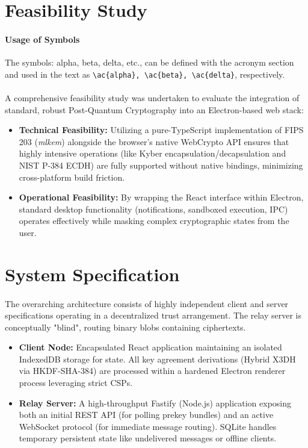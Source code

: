 \section{Feasibility Study}
\paragraph{Usage of Symbols} The symbols: \ac{alpha}, \ac{beta}, \ac{delta}, etc., can be defined with the acronym section and used in the text as \verb|\ac{alpha}, \ac{beta}, \ac{delta}|, respectively. 

\paragraph{}
A comprehensive feasibility study was undertaken to evaluate the integration of standard, robust Post-Quantum Cryptography into an Electron-based web stack:
\begin{itemize}
	\item \textbf{Technical Feasibility:} Utilizing a pure-TypeScript implementation of FIPS 203 (\textit{mlkem}) alongside the browser's native WebCrypto API ensures that highly intensive operations (like Kyber encapsulation/decapsulation and NIST P-384 ECDH) are fully supported without native bindings, minimizing cross-platform build friction.
	\item \textbf{Operational Feasibility:} By wrapping the React interface within Electron, standard desktop functionality (notifications, sandboxed execution, IPC) operates effectively while masking complex cryptographic states from the user.
\end{itemize}


\section{System Specification}
\paragraph{}
The overarching architecture consists of highly independent client and server specifications operating in a decentralized trust arrangement. The relay server is conceptually "blind", routing binary blobs containing ciphertexts.

\begin{itemize}
	\item \textbf{Client Node:} Encapsulated React application maintaining an isolated IndexedDB storage for state. All key agreement derivations (Hybrid X3DH via HKDF-SHA-384) are processed within a hardened Electron renderer process leveraging strict CSPs.
	\item \textbf{Relay Server:} A high-throughput Fastify (Node.js) application exposing both an initial REST API (for polling prekey bundles) and an active WebSocket protocol (for immediate message routing). SQLite handles temporary persistent state like undelivered messages or offline clients. 
\end{itemize}

